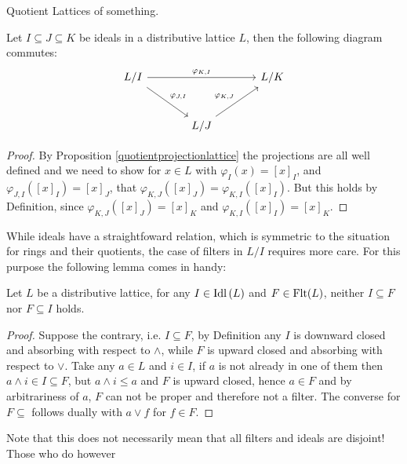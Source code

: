 \begin{subsection}{Quotient Lattices}
    of something.
    \begin{lemma} \label{triangleidealcommutes}
        Let \( I \subseteq J \subseteq K \) be ideals in a distributive lattice \( L \), then the following 
        diagram commutes:
        \[
        \begin{tikzcd}[row sep=large, column sep=large]
            L / I \arrow[dr, "\varphi_{J, I}"] \arrow[rr, "\varphi_{K, I}"] & & L / K \\
                                                                            & L / J \arrow[ur, "\varphi_{K, J}"]  
        \end{tikzcd}
        \]
    \end{lemma}
    \begin{proof}
        By Proposition \ref{quotientprojectionlattice} the projections are all well defined
        and we need to show for \( x \in L \) with \( \varphi_{I}(x) = [x]_I \), 
        and \( \varphi_{J, I}([x]_{I}) = [x]_{J} \), that \( \varphi_{K, J}([x]_{J}) = \varphi_{K, I}([x]_{I}) \).
        But this holds by Definition, since \( \varphi_{K, J}([x]_{J}) = [x]_{K} \) and \( \varphi_{K, I}([x]_{I}) = [x]_{K} \).
    \end{proof}
    While ideals have a straightfoward relation, which is symmetric to the situation for rings and their quotients, the case of  
    filters in \( L / I \) requires more care.
    For this purpose the following lemma comes in handy:
    \begin{lemma} \label{filterandidealsdonotcontain}
        Let \( L \) be a distributive lattice, for any \( I \in \text{Idl}\left (L \right) \)
        and \( F \in \textnormal{Flt}({L}) \), neither \( I \subseteq F \) nor \( F \subseteq I \) holds.
    \end{lemma}
    \begin{proof}
        Suppose the contrary, i.e. \( I \subseteq F \), by Definition
        any \( I \) is downward closed and absorbing with respect to \( \wedge \), while \( F \)
        is upward closed and absorbing with respect to \( \vee \). Take any \( a \in L \)
        and \( i \in I \), if \( a \) is not already in one of them
        then \( a \wedge i \in I \subseteq F \), but \( a \wedge i \leq a \) and \( F \)
        is upward closed, hence \( a \in F \) and by arbitrariness of \( a \), \( F \) can not be proper
        and therefore not a filter.
        The converse for \( F \subseteq \) follows dually with \( a \vee f \) for \( f \in F \).
    \end{proof}
    Note that this does not necessarily mean that all filters and ideals are disjoint! Those who do however

\end{subsection}
